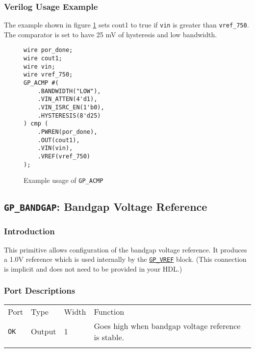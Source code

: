 \documentclass[11pt]{article}
\newcommand{\tokenstyle}[1]{\texttt{#1}}
\newcommand{\wirestyle}[1]{\texttt{#1}}
\newcommand{\whenstyle}[1]{{\fontseries{sb}\selectfont#1}}
\newcommand{\tokenref}[2]{\hyperref[#2]{\tokenstyle{#1}}}
\newcommand{\thinhline}{\Xhline{1\arrayrulewidth}}
\newcommand{\thickhline}{\Xhline{2.5\arrayrulewidth}}
\begin{document}
\subsubsection{Verilog Usage Example}

The example shown in figure \ref{gp-acmp-example} sets cout1 to true if \wirestyle{vin} is greater than \wirestyle{vref\_750}. The comparator is set to have 25 mV of hysteresis and low bandwidth.

\begin{figure}[h]
\begin{lstlisting}
wire por_done;
wire cout1;
wire vin;
wire vref_750;
GP_ACMP #(
	.BANDWIDTH("LOW"),
	.VIN_ATTEN(4'd1),
	.VIN_ISRC_EN(1'b0),
	.HYSTERESIS(8'd25)
) cmp (
	.PWREN(por_done),
	.OUT(cout1),
	.VIN(vin),
	.VREF(vref_750)
);
\end{lstlisting}
\caption{Example usage of \tokenstyle{GP\_ACMP}}
\label{gp-acmp-example}
\end{figure}


\pagebreak
\clearpage
\subsection{\tokenstyle{GP\_BANDGAP}: Bandgap Voltage Reference}

\subsubsection{Introduction}
This primitive allows configuration of the bandgap voltage reference. It produces a 1.0V reference which is used
internally by the \tokenref{GP\_VREF}{gp-vref} block. (This connection is implicit and does not need to be provided in
your HDL.)

\subsubsection{Port Descriptions}

\begin{tabularx}{\textwidth}{lllX}
\thinhline
\whenstyle{Port} & \whenstyle{Type} & \whenstyle{Width} & \whenstyle{Function} \\
\thickhline
\tokenstyle{OK} & Output & 1 & Goes high when bandgap voltage reference is stable. \\
\thinhline
\end{tabularx}
\end{document}

